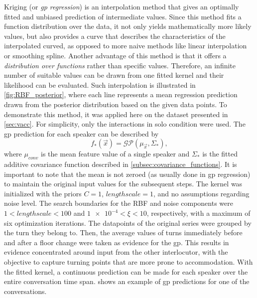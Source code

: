 Kriging (or \textit{\acl{gp} regression}) is an interpolation method that gives an optimally fitted and unbiased prediction of intermediate values.
Since this method fits a function distribution over the data, it not only yields mathematically more likely values, but also provides a curve that describes the characteristics of the interpolated curved, as opposed to more naive methods like linear interpolation or smoothing spline.
Another advantage of this method is that it offers a \textit{distribution over functions} rather than specific values.
Therefore, an infinite number of suitable values can be drawn from one fitted kernel and their likelihood can be evaluated.
Such interpolation is illustrated in \cref{fig:RBF_posterior}, where each line represents a mean regression prediction drawn from the posterior distribution based on the given data points.
To demonstrate this method, it was applied here on the dataset presented in \cref{sec:vacc}.
For simplicity, only the interactions in solo condition were used.
The \ac{gp} prediction for each speaker can be described by
%
\begin{equation}
	\label{eq:gp_function_prediction}
	f_*(\vec{x}) = \mathcal{GP}(\mu_{\vec{x}}, \Sigma_*),
\end{equation}
\noindent
%
where $\mu_{conv}$ is the mean feature value of a single speaker and $\Sigma_*$ is the fitted additive covariance function described in \cref{subsec:covariance_functions}.
It is important to note that the mean is not zeroed (as usually done in \ac{gp} regression) to maintain the original input values for the subsequent steps.
The kernel was initialized with the priors $C = 1$, $lengthscale = 1$, and no assumptions regarding noise level.
The search boundaries for the RBF and noise components were $1 < lengthscale < 100$ and $\num{1e-4} < \xi < 10$, respectively, with a maximum of six optimization iterations.
The datapoints of the original series were grouped by the turn they belong to.
Then, the average values of turns immediately before and after a floor change were taken as evidence for the \ac{gp}.
This results in evidence concentrated around input from the other interlocutor, with the objective to capture turning points that are more prone to accommodation.
With the fitted kernel, a continuous prediction can be made for each speaker over the entire conversation time span.
 shows an example of \ac{gp} predictions for one of the conversations.
